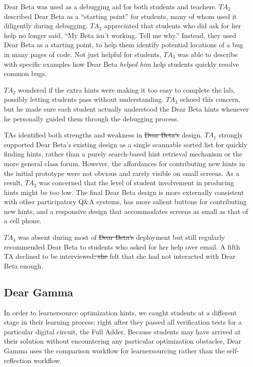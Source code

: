 \documentclass[12pt,twoside]{mitthesis}
\providecommand{\DIFaddtex}[1]{{\protect\color{blue}\uwave{#1}}} %
\providecommand{\DIFdeltex}[1]{{\protect\color{red}\sout{#1}}}                      %
\providecommand{\DIFaddbegin}{} %
\providecommand{\DIFaddend}{} %
\providecommand{\DIFdelbegin}{} %
\providecommand{\DIFdelend}{} %
\providecommand{\DIFadd}[1]{\texorpdfstring{\DIFaddtex{#1}}{#1}} %
\providecommand{\DIFdel}[1]{\texorpdfstring{\DIFdeltex{#1}}{}} %
\begin{document}
Dear Beta was used as a debugging aid for both students and teachers. $TA_{2}$ described Dear Beta as a ``starting point'' for students, many of whom used it diligently during debugging. $TA_{2}$ appreciated that students who did ask for her help no longer said, ``My Beta isn't working. Tell me why.'' Instead, they used Dear Beta as a starting point, to help them identify potential locations of a bug in many pages of code. Not just helpful for students, $TA_{3}$ was able to describe with specific examples how Dear Beta \textit{helped him} help students quickly resolve common bugs.

$TA_{2}$ wondered if the extra hints were making it too easy to complete the lab, possibly letting students pass without understanding. $TA_{3}$ echoed this concern, but he made sure each student actually understood the Dear Beta hints whenever he personally guided them through the debugging process.

TAs identified both strengths and weakness in \DIFdelbegin \DIFdel{Dear Beta's }\DIFdelend \DIFaddbegin \DIFadd{the Dear Beta }\DIFaddend design. $TA_{1}$ strongly supported Dear Beta's existing design as a single scannable sorted list for quickly finding hints, rather than a purely search-based hint retrieval mechanism or the more general class forum. However, the affordances for contributing new hints in the initial prototype were not obvious and rarely visible on small screens. As a result, $TA_{2}$ was concerned that the level of student involvement in producing hints might be too low. The final Dear Beta design is more externally consistent with other participatory Q\&A systems, has more salient buttons for contributing new hints, and a responsive design that accommodates screens as small as that of a cell phone. 

$TA_{4}$ was absent during most of \DIFdelbegin \DIFdel{Dear Beta's }\DIFdelend \DIFaddbegin \DIFadd{the Dear Beta }\DIFaddend deployment but still regularly recommended Dear Beta to students who asked for her help over email. A fifth TA declined to be interviewed\DIFdelbegin \DIFdel{; she }\DIFdelend \DIFaddbegin \DIFadd{. She }\DIFaddend felt that she had not interacted with Dear Beta enough.

\subsection{Dear Gamma}

In order to learnersource optimization hints, we caught students at a different stage in their learning process: right after they passed all verification tests for a particular digital circuit, the Full Adder. Because students may have arrived at their solution without encountering any particular optimization obstacles, Dear Gamma uses the comparison workflow for learnersourcing rather than the self-reflection workflow. 
\end{document}
